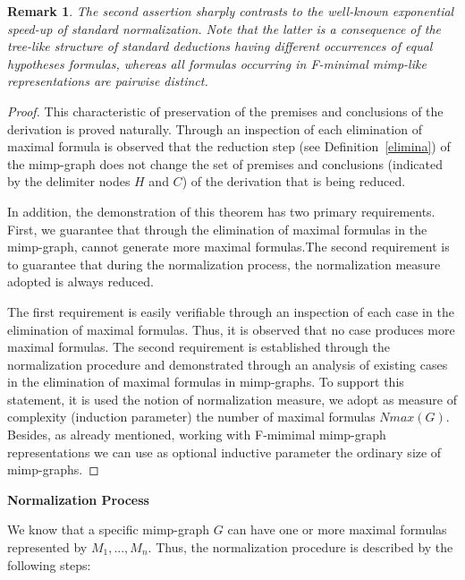 \documentclass[submission,copyright,creativecommons]{eptcs}
\newtheorem{remark}[theorem]{Remark}
\begin{document}
\begin{remark}
The second assertion sharply contrasts to the well-known exponential speed-up of
standard normalization. Note that the latter is a consequence of the
tree-like structure of standard deductions having different occurrences of
equal hypotheses formulas, whereas all formulas occurring in F-minimal
mimp-like representations are pairwise distinct.
\end{remark}

\begin{proof}
This characteristic of preservation of the premises and conclusions of the 
derivation is proved naturally. Through an inspection of each elimination 
of maximal formula is observed that the reduction step (see Definition~\ref{elimina}) 
of the mimp-graph does not change the set of premises and conclusions 
(indicated by the delimiter nodes $H$ and $C$) of the derivation that is being reduced.

In addition, the demonstration of this theorem has two primary requirements. 
First, we guarantee that through the elimination of maximal formulas in the 
mimp-graph, cannot generate more maximal formulas.The second requirement is to guarantee that during the normalization process, 
the normalization measure adopted is always reduced. 

The first requirement is easily verifiable through an inspection of each case 
in the elimination of maximal formulas. Thus, it is observed that no case 
produces more maximal formulas. The second requirement is established through 
the normalization procedure and demonstrated through an analysis of existing 
cases in the elimination of maximal formulas in mimp-graphs. To support this 
statement, it is used the notion of normalization measure, we adopt as measure 
of complexity (induction parameter) the number of maximal formulas $Nmax(G)$. 
Besides, as already mentioned, working with F-mimimal mimp-graph representations we 
can use as optional inductive parameter the ordinary size of mimp-graphs.   
\end{proof}

\textbf{Normalization Process}

We know that a specific mimp-graph $G$ can have one or more maximal formulas
represented by $M_1, ..., M_n$. Thus, the normalization procedure is
described by the following steps:
\end{document}
